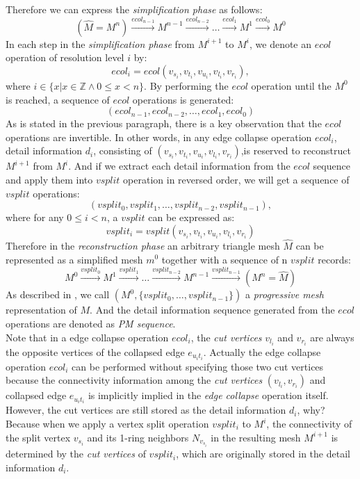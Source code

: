 Therefore we can express the \emph{simplification phase} as follows:
$$
	(\hat{M}=M^n)\xrightarrow{ecol_{n-1}}{M^{n-1}}\xrightarrow{ecol_{n-2}}\ldots\xrightarrow{ecol_1}{M^1}\xrightarrow{ecol_0}{M^0}
$$
In each step in the \emph{simplification phase} from $M^{i+1}$ to $M^i$, we denote an $ecol$ operation of resolution level $i$ by:
$$
	ecol_i=ecol(v_{s_i},v_{t_i},v_{u_i},v_{l_i},v_{r_i}),
$$
where $i\in\{x|x\in{\mathbb{Z}}\wedge 0\le x <n\}$. By performing the $ecol$ operation until the $M^0$ is reached, a sequence of $ecol$ operations is generated: 
$$(ecol_{n-1},ecol_{n-2},\ldots,ecol_{1},ecol_{0})$$
As is stated in the previous paragraph, there is a key observation that the $ecol$ operations are invertible. In other words, in any edge collapse operation $ecol_i$, detail information $d_i$, consisting of $(v_{s_i},v_{t_i},v_{u_i},v_{l_i},v_{r_i})$,is reserved to reconstruct $M^{i+1}$ from $M^{i}$. And if we extract each detail information from the $ecol$ sequence and apply them into $vsplit$ operation in reversed order, we will get a sequence of $vsplit$ operations:
$$
	(vsplit_{0},vsplit_{1},\ldots,vsplit_{n-2},vsplit_{n-1}),
$$
where for any $0\le i < n$, a $vsplit$ can be expressed as:
$$
	vsplit_i=vsplit(v_{s_i},v_{t_i},v_{u_i},v_{l_i},v_{r_i})
$$
Therefore in the \emph{reconstruction phase} an arbitrary triangle mesh $\hat{M}$ can be represented as a simplified mesh $m^0$ together with a sequence of n $vsplit$ records:
$$
	M^0\xrightarrow{vsplit_0}M^1\xrightarrow{vsplit_1}\ldots\xrightarrow{vsplit_{n-2}}M^{n-1}\xrightarrow{vsplit_{n-1}}(M^n=\hat{M})
$$
As described in \cite{Hoppe:1996:PM}, we call $(M^0,\{vsplit_0,\ldots,vsplit_{n-1}\})$ a \emph{progressive mesh} representation of $M$. And the detail information sequence generated from the $ecol$ operations are denoted as \emph{PM sequence}.\\

Note that in a edge collapse operation $ecol_i$, the \emph{cut vertices} $v_{l_i}$ and $v_{r_i}$ are always the opposite vertices of the collapsed edge $e_{{u_i}{t_i}}$. Actually the edge collapse operation $ecol_i$ can be performed without specifying those two cut vertices because the connectivity information among the \emph{cut vertices} $(v_{l_i},v_{r_i})$ and collapsed edge $e_{{u_i}{t_i}}$ is implicitly implied in the \emph{edge collapse} operation itself. However, the cut vertices are still stored as the detail information $d_i$, why? Because when we apply a vertex split operation $vsplit_i$ to $M^i$, the connectivity of the split vertex $v_{s_i}$ and its 1-ring neighbors $N_{v_{s_{i}}}$ in the resulting mesh $M^{i+1}$ is determined by the \emph{cut vertices} of $vsplit_i$, which are originally stored in the detail information $d_i$.  \\

